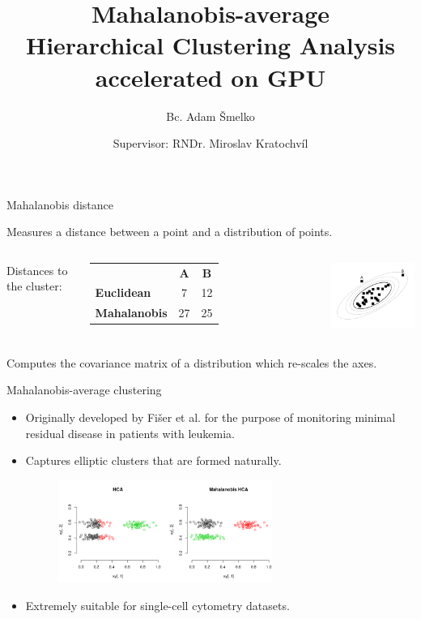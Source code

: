 \documentclass[10pt]{beamer}
\title{Mahalanobis-average \\Hierarchical Clustering Analysis \\accelerated on GPU}
\author{Bc. Adam Šmelko}
\date{Supervisor: RNDr. Miroslav Kratochvíl}
\institute{Department of Software Engineering}
\begin{document}
\maketitle


\begin{frame}{Mahalanobis distance}
	
	Measures a distance between a point and a distribution of points.
	\begin{block}{}
		\begin{columns}
			Distances to the cluster:
			\begin{table}
				\begin{tabular}{lcc}
					& \textbf{A} & \textbf{B}\\
					\textbf{Euclidean} & 7 & 12 \\
					\textbf{Mahalanobis} & 27 & 25 \\
				\end{tabular}
			\end{table}
			\includegraphics[width=5cm]{img/maha_dist}
		\end{columns}
	\end{block}

	Computes the covariance matrix of a distribution which re-scales the axes.
		
\end{frame}


\begin{frame}{Mahalanobis-average clustering}
	
	\begin{itemize}
		\item Originally developed by Fišer et al. for the purpose of monitoring
	minimal residual disease in patients with leukemia.
	\item Captures elliptic clusters that are formed naturally.
	
	\begin{figure}
		\includegraphics[width=7cm]{img/mhca}
	\end{figure}
	\item Extremely suitable for single-cell cytometry datasets.
	
	\end{itemize}
	
\end{frame}
\end{document}
